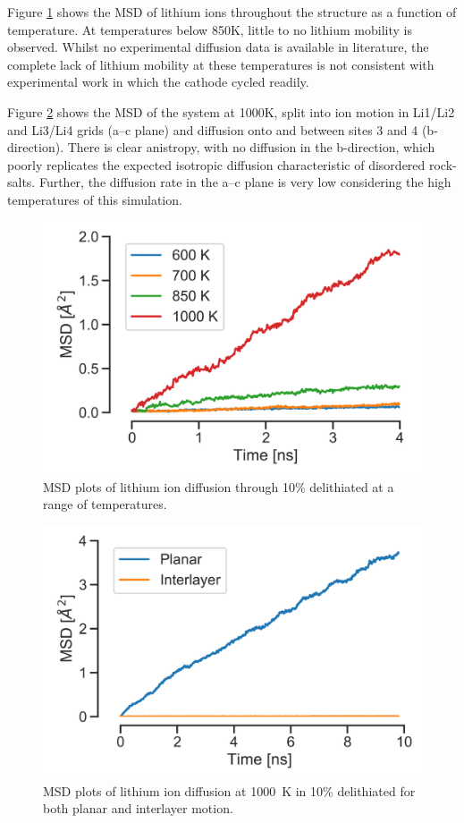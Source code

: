 Figure \ref{fig:msdall} shows the MSD of lithium ions throughout the structure as a function of temperature.
At temperatures below 850K, little to no lithium mobility is observed.
Whilst no experimental diffusion data is available in literature, the complete lack of lithium mobility at these temperatures is not consistent with experimental work in which the cathode cycled readily.

Figure \ref{fig:msd1000} shows the MSD of the system at 1000K, split into ion motion in Li1/Li2 and Li3/Li4 grids (a--c plane) and diffusion onto and between sites 3 and 4 (b-direction).
There is clear anistropy, with no diffusion in the b-direction, which poorly replicates the expected isotropic diffusion characteristic of disordered rock-salts.
Further, the diffusion rate in the a--c plane is very low considering the high temperatures of this simulation.

\begin{figure}[p]
\centering
\includegraphics[width=0.8\linewidth]{figures/static/MSD_all}
\caption{MSD plots of lithium ion diffusion through 10\% delithiated  at a range of temperatures.}
\label{fig:msdall}
\end{figure}

\begin{figure}[p]
\centering
\includegraphics[width=0.8\linewidth]{figures/static/MSD_1000}
\caption{MSD plots of lithium ion diffusion at \SI{1000}{\kelvin} in 10\% delithiated  for both planar and interlayer motion.}
\label{fig:msd1000}
\end{figure}

